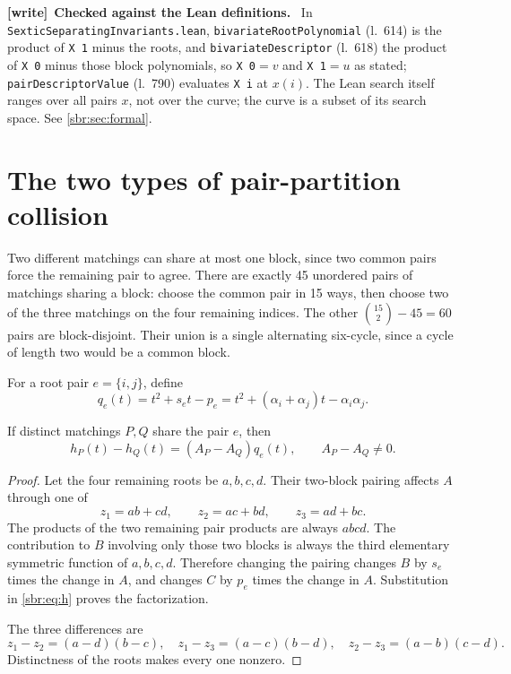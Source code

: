 \documentclass[11pt,letterpaper]{article}
\numberwithin{equation}{section}
\theoremstyle{definition}
\theoremstyle{remark}
\newcommand{\src}[1]{\texttt{\nolinkurl{#1}}}
\newenvironment{writenote}[1][]{\par\smallskip\begingroup\small
 \noindent\textbf{[write]}\if\relax\detokenize{#1}\relax\else~\textbf{#1.}\fi\ }%
 {\par\endgroup\smallskip}
\begin{document}
\begin{writenote}[Checked against the Lean definitions]
In \src{SexticSeparatingInvariants.lean}, \src{bivariateRootPolynomial}
(l.~614) is the product of \src{X 1} minus the roots, and
\src{bivariateDescriptor} (l.~618) the product of \src{X 0} minus those
block polynomials, so \src{X 0}${}=v$ and \src{X 1}${}=u$ as stated;
\src{pairDescriptorValue} (l.~790) evaluates \src{X i} at $x(i)$. The
Lean search itself ranges over all pairs $x$, not over the curve; the curve
is a subset of its search space. See \cref{sbr:sec:formal}.
\end{writenote}

\section{The two types of pair-partition collision}
\label{sbr:sec:pair-collisions}

Two different matchings can share at most one block, since two common pairs
force the remaining pair to agree. There are exactly 45 unordered pairs of
matchings sharing a block: choose the common pair in 15 ways, then choose
two of the three matchings on the four remaining indices. The other
$\binom{15}{2}-45=60$ pairs are block-disjoint. Their union is a single
alternating six-cycle, since a cycle of length two would be a common block.

For a root pair $e=\{i,j\}$, define
\begin{equation}
 q_e(t)=t^2+s_et-p_e
       =t^2+(\alpha_i+\alpha_j)t-\alpha_i\alpha_j.
 \label{sbr:eq:q}
\end{equation}

\begin{lemma}
\label{sbr:lem:shared}
If distinct matchings $P,Q$ share the pair $e$, then
\begin{equation}
 h_P(t)-h_Q(t)=(A_P-A_Q)q_e(t),\qquad A_P-A_Q\ne0.
 \label{sbr:eq:shared}
\end{equation}
\end{lemma}
\begin{proof}
Let the four remaining roots be $a,b,c,d$. Their two-block pairing affects
$A$ through one of
\[
 z_1=ab+cd,\qquad z_2=ac+bd,\qquad z_3=ad+bc.
\]
The products of the two remaining pair products are always $abcd$.
The contribution to $B$ involving only those two blocks is always the
third elementary symmetric function of $a,b,c,d$. Therefore changing the
pairing changes $B$ by $s_e$ times the change in $A$, and changes $C$ by
$p_e$ times the change in $A$. Substitution in \cref{sbr:eq:h} proves the
factorization.

The three differences are
\begin{equation}
 z_1-z_2=(a-d)(b-c),\quad
 z_1-z_3=(a-c)(b-d),\quad
 z_2-z_3=(a-b)(c-d).
 \label{sbr:eq:four-root-differences}
\end{equation}
Distinctness of the roots makes every one nonzero.
\end{proof}
\end{document}
